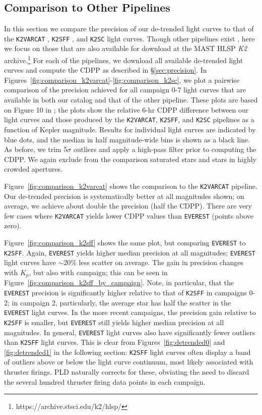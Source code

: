 \documentclass[]{emulateapj}
\begin{document}
\subsection{Comparison to Other Pipelines}
\label{sec:comparison}
In this section we compare the precision of our de-trended light curves to that of the
\texttt{K2VARCAT} \citep{ARM15}, \texttt{K2SFF} \citep{VJ14}, and \texttt{K2SC} \citep{AIG16} light curves. Though other
pipelines exist \citep[e.g.,][]{LUN15, HUA15, CRO15}, here we focus on those that 
are also available for download at
the MAST HLSP \emph{K2} archive.\footnote{https://archive.stsci.edu/k2/hlsp/}
For each of the pipelines, we download all available de-trended light curves and
compute the CDPP as described in \S\ref{sec:precision}. In 
Figures~\ref{fig:comparison_k2varcat}-\ref{fig:comparison_k2sc}, we plot a pairwise
comparison of the precision achieved for all campaign 0-7 light curves that are
available in both our catalog and that of the other pipeline. These plots are based
on Figure 10 in \cite{AIG16}; the plots show the relative 6-hr CDPP difference between
our light curves and those produced by the \texttt{K2VARCAT}, \texttt{K2SFF}, and \texttt{K2SC}
pipelines as a function of Kepler magnitude. Results for individual light curves are indicated by
blue dots, and the median in half magnitude-wide bins is shown as a black line.
As before, we trim
5$\sigma$ outliers and apply a high-pass filter prior to computing the CDPP.
We again exclude from the comparison saturated stars and stars in highly crowded apertures.

Figure~\ref{fig:comparison_k2varcat} shows the comparison to the \texttt{K2VARCAT}
pipeline. Our de-trended precision is systematically better at all magnitudes shown;
on average, we achieve about double the precision (half the CDPP). There are very
few cases where \texttt{K2VARCAT} yields lower CDPP values than \texttt{EVEREST}
(points above zero).

Figure~\ref{fig:comparison_k2sff} shows the same plot, but comparing \texttt{EVEREST} to
\texttt{K2SFF}. Again, \texttt{EVEREST} yields higher median precision at all
magnitudes; \texttt{EVEREST} light curves have $\sim 20\%$ less scatter on average. The
gain in precision changes with $K_p$, but also with campaign; this can be seen in 
Figure~\ref{fig:comparison_k2sff_by_campaign}. Note, in particular, that the \texttt{EVEREST}
precision is significantly higher relative to that of \texttt{K2SFF} in campaigns 0-2;
in campaign 2, particularly, the average star has half the scatter in the \texttt{EVEREST}
light curves. In the more recent campaigns, the precision gain relative to \texttt{K2SFF}
is smaller, but \texttt{EVEREST} still yields higher median precision at all magnitudes.
In general, \texttt{EVEREST} light curves also have significantly fewer outliers than \texttt{K2SFF} light curves.
This is clear from Figures~\ref{fig:detrended0} and \ref{fig:detrended1} in the
following section: \texttt{K2SFF} light curves often display a band of outliers
above or below the light curve continuum, most likely associated with thruster firings. PLD
naturally corrects for these, obviating the need to discard the several hundred thruster
firing data points in each campaign.
\end{document}
